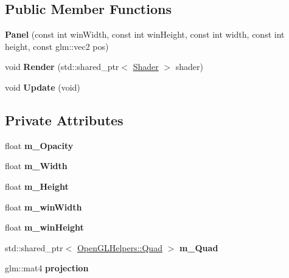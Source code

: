 \subsection*{Public Member Functions}
\begin{DoxyCompactItemize}
\item 
{\bfseries Panel} (const int win\+Width, const int win\+Height, const int width, const int height, const glm\+::vec2 pos)\hypertarget{class_panel_ac1eaa9c5d59554d3287bfba615f8d3cd}{}\label{class_panel_ac1eaa9c5d59554d3287bfba615f8d3cd}

\item 
void {\bfseries Render} (std\+::shared\+\_\+ptr$<$ \hyperlink{class_shader}{Shader} $>$ shader)\hypertarget{class_panel_aad8065de71d84c90aa366d0a2869c99e}{}\label{class_panel_aad8065de71d84c90aa366d0a2869c99e}

\item 
void {\bfseries Update} (void)\hypertarget{class_panel_acbf83735b56674b87ebe271bd72cd25b}{}\label{class_panel_acbf83735b56674b87ebe271bd72cd25b}

\end{DoxyCompactItemize}
\subsection*{Private Attributes}
\begin{DoxyCompactItemize}
\item 
float {\bfseries m\+\_\+\+Opacity}\hypertarget{class_panel_aeebb677a20722ec270b18704a0e6dae6}{}\label{class_panel_aeebb677a20722ec270b18704a0e6dae6}

\item 
float {\bfseries m\+\_\+\+Width}\hypertarget{class_panel_a8335bcba5a35a90612a45856b93ee0d9}{}\label{class_panel_a8335bcba5a35a90612a45856b93ee0d9}

\item 
float {\bfseries m\+\_\+\+Height}\hypertarget{class_panel_ac337c6443dc3ac3183695f5c6ad6a784}{}\label{class_panel_ac337c6443dc3ac3183695f5c6ad6a784}

\item 
float {\bfseries m\+\_\+win\+Width}\hypertarget{class_panel_aa709b2ff808992110294003a05719313}{}\label{class_panel_aa709b2ff808992110294003a05719313}

\item 
float {\bfseries m\+\_\+win\+Height}\hypertarget{class_panel_a5369f23a3fca8182c2b84c1ba5ca1dc0}{}\label{class_panel_a5369f23a3fca8182c2b84c1ba5ca1dc0}

\item 
std\+::shared\+\_\+ptr$<$ \hyperlink{class_open_g_l_helpers_1_1_quad}{Open\+G\+L\+Helpers\+::\+Quad} $>$ {\bfseries m\+\_\+\+Quad}\hypertarget{class_panel_abeb3d66374b1338ac5baae78e39f0ee6}{}\label{class_panel_abeb3d66374b1338ac5baae78e39f0ee6}

\item 
glm\+::mat4 {\bfseries projection}\hypertarget{class_panel_ae58048a588d2bfec9b6a84a7917ee557}{}\label{class_panel_ae58048a588d2bfec9b6a84a7917ee557}

\end{DoxyCompactItemize}
